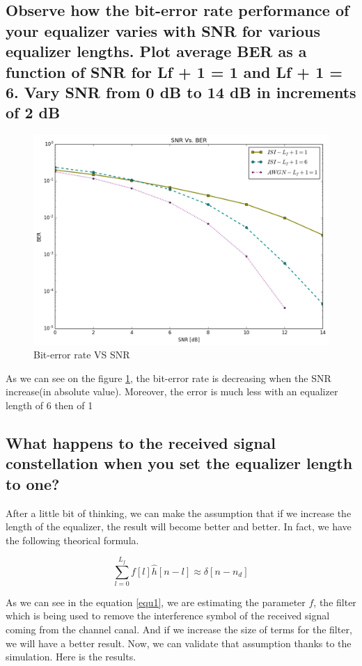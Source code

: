 \documentclass[frenchb, oneside, headings=normal]{scrartcl}
\begin{document}
\subsection{Observe how the bit-error rate performance
of your equalizer varies with SNR for various equalizer lengths. Plot average BER as a function of SNR for Lf + 1 = 1 and Lf + 1 = 6.
Vary SNR from 0 dB to 14 dB in increments of 2 dB}

\begin{figure}[ht!]
\centering
\includegraphics[scale=0.35]{img/SNR.png}
\caption{Bit-error rate VS SNR}
\label{BER}
\end{figure}


As we can see on the figure \ref{BER}, the bit-error rate is decreasing when the SNR increase(in absolute value).
Moreover, the error is much less with an equalizer length of 6 then  of 1


\subsection{What happens to the received signal constellation when you set the equalizer length to one?}

After a little bit of thinking, we can make the assumption that if we increase the length of the equalizer, the result will become better and better. In fact, we have the following theorical formula. 

\begin{equation}
\sum_{l=0}^{L_f}f[l]\hat{h}[n-l]\approx \delta [n-n_d]
\label{equ1}
\end{equation}

As we can see in the equation \ref{equ1}, we are estimating the parameter $f$, the filter which is being used to remove the interference symbol of the received signal coming from the channel canal. And if we increase the size of terms for the filter, we will have a better result. Now, we can validate that assumption thanks to the simulation. Here is the results.
\end{document}
